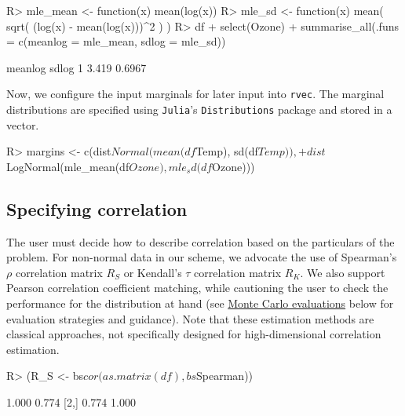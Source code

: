 \documentclass[
]{jss}
\begin{document}
\begin{CodeChunk}
\begin{CodeInput}
R> mle_mean <- function(x) mean(log(x))
R> mle_sd <- function(x) mean( sqrt( (log(x) - mean(log(x)))^2 ) )
R> df %
+   select(Ozone) %
+   summarise_all(.funs = c(meanlog = mle_mean, sdlog = mle_sd))
\end{CodeInput}
\begin{CodeOutput}
  meanlog  sdlog
1   3.419 0.6967
\end{CodeOutput}
\end{CodeChunk}

Now, we configure the input marginals for later input into \texttt{rvec}. The marginal distributions are specified using \texttt{Julia}'s \texttt{Distributions} package and stored in a vector.

\begin{CodeChunk}
\begin{CodeInput}
R> margins <- c(dist$Normal(mean(df$Temp), sd(df$Temp)),
+              dist$LogNormal(mle_mean(df$Ozone), mle_sd(df$Ozone)))
\end{CodeInput}
\end{CodeChunk}

\hypertarget{specifying-correlation}{%
\subsection{Specifying correlation}\label{specifying-correlation}}

The user must decide how to describe correlation based on the particulars of the problem. For non-normal data in our scheme, we advocate the use of Spearman's \(\rho\) correlation matrix \(R_S\) or Kendall's \(\tau\) correlation matrix \(R_K\). We also support Pearson correlation coefficient matching, while cautioning the user to check the performance for the distribution at hand (see \protect\hyperlink{simulations}{Monte Carlo evaluations} below for evaluation strategies and guidance). Note that these estimation methods are classical approaches, not specifically designed for high-dimensional correlation estimation.

\begin{CodeChunk}
\begin{CodeInput}
R> (R_S <- bs$cor(as.matrix(df), bs$Spearman))
\end{CodeInput}
\begin{CodeOutput}
      [,1]  [,2]
[1,] 1.000 0.774
[2,] 0.774 1.000
\end{CodeOutput}
\end{CodeChunk}
\end{document}
